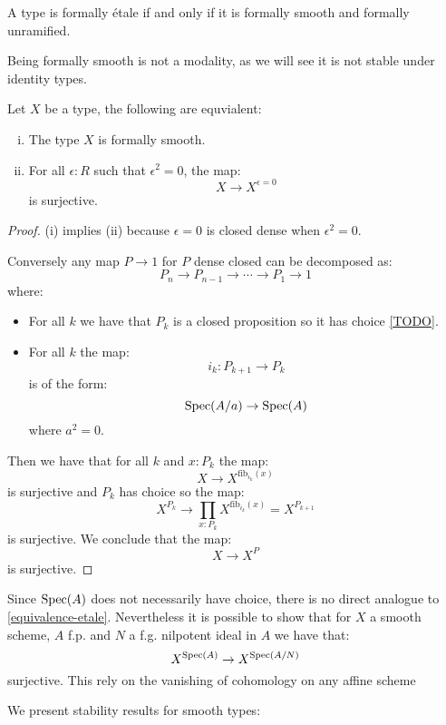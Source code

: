 \begin{remark}
A type is formally étale if and only if it is formally smooth and formally unramified.
\end{remark}

\begin{remark}
Being formally smooth is not a modality, as we will see it is not stable under identity types.
\end{remark}

\begin{lemma}\label{equivalence-smooth}
Let $X$ be a type, the following are equvialent:
\begin{enumerate}[(i)]
\item The type $X$ is formally smooth.
\item For all $\epsilon:R$ such that $\epsilon^2=0$, the map:
\[X\to X^{\epsilon=0}\]
is surjective.
\end{enumerate}
\end{lemma}

\begin{proof}
(i) implies (ii) because $\epsilon=0$ is closed dense when $\epsilon^2=0$.

Conversely any map $P\to 1$ for $P$ dense closed can be decomposed as:
\[P_n \to P_{n-1}\to \cdots \to P_1\to 1\]
where:
\begin{itemize}
\item For all $k$ we have that $P_k$ is a closed proposition so it has choice \cref{TODO}.
\item For all $k$ the map:
\[i_k : P_{k+1}\to P_{k}\]
is of the form:
\[\operatorname{Spec}(A/a)\to \operatorname{Spec}(A)\]
where $a^2=0$.
\end{itemize}
Then we have that for all $k$ and $x:P_{k}$ the map:
\[X\to X^{\mathrm{fib}_{i_k}(x)}\]
is surjective and $P_{k}$ has choice so the map:
\[X^{P_{k}} \to \prod_{x:P_{k}}X^{\mathrm{fib}_{i_k}(x)} = X^{P_{k+1}}\]
is surjective. We conclude that the map:
\[X\to X^P\]
is surjective.
\end{proof}

\begin{remark}
Since $\operatorname{Spec}(A)$ does not necessarily have choice, there is no direct analogue to \cref{equivalence-etale}. Nevertheless it is possible to show that for $X$ a smooth scheme, $A$ f.p. and $N$ a f.g. nilpotent ideal in $A$ we have that:
\[X^{\operatorname{Spec}(A)} \to X^{\operatorname{Spec}(A/N)}\]
surjective. This rely on the vanishing of cohomology on any affine scheme
\end{remark}

We present stability results for smooth types:

